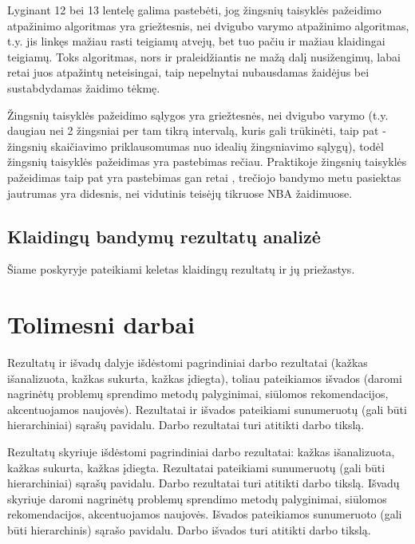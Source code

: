 \documentclass{VUMIFPSbakalaurinis}
\begin{document}
Lyginant 12 bei 13 lentelę galima pastebėti, jog žingsnių taisyklės pažeidimo atpažinimo algoritmas yra griežtesnis, nei dvigubo varymo atpažinimo algoritmas, t.y. jis linkęs mažiau rasti teigiamų atvejų, bet tuo pačiu ir mažiau klaidingai teigiamų. Toks algoritmas, nors ir praleidžiantis ne mažą dalį nusižengimų, labai retai juos atpažintų neteisingai, taip nepelnytai nubausdamas žaidėjus bei sustabdydamas žaidimo tėkmę. 

Žingsnių taisyklės pažeidimo sąlygos yra griežtesnės, nei dvigubo varymo (t.y. daugiau nei 2 žingsniai per tam tikrą intervalą, kuris gali trūkinėti, taip pat - žingsnių skaičiavimo priklausomumas nuo idealių žingsniavimo sąlygų), todėl žingsnių taisyklės pažeidimas yra pastebimas rečiau. Praktikoje žingsnių taisyklės pažeidimas taip pat yra pastebimas gan retai \cite{SiglerK}, trečiojo bandymo metu pasiektas jautrumas yra didesnis, nei vidutinis teisėjų tikruose NBA žaidimuose. 

\subsection{Klaidingų bandymų rezultatų analizė}

Šiame poskyryje pateikiami keletas klaidingų rezultatų ir jų priežastys. 

\section{Tolimesni darbai}


Rezultatų ir išvadų dalyje išdėstomi pagrindiniai darbo rezultatai (kažkas
išanalizuota, kažkas sukurta, kažkas įdiegta), toliau pateikiamos išvados
(daromi nagrinėtų problemų sprendimo metodų palyginimai, siūlomos
rekomendacijos, akcentuojamos naujovės). Rezultatai ir išvados pateikiami
sunumeruotų (gali būti hierarchiniai) sąrašų pavidalu. Darbo rezultatai turi
atitikti darbo tikslą.

Rezultatų skyriuje išdėstomi pagrindiniai darbo rezultatai: kažkas išanalizuota, kažkas sukurta, kažkas įdiegta. Rezultatai pateikiami sunumeruotų (gali būti hierarchiniai) sąrašų pavidalu. Darbo rezultatai turi atitikti darbo tikslą.
Išvadų skyriuje daromi nagrinėtų problemų sprendimo metodų palyginimai, siūlomos rekomendacijos, akcentuojamos naujovės. Išvados pateikiamos sunumeruoto (gali būti hierarchinis) sąrašo pavidalu. Darbo išvados turi atitikti darbo tikslą. 


\printbibliography[heading=bibintoc]  %
\end{document}
